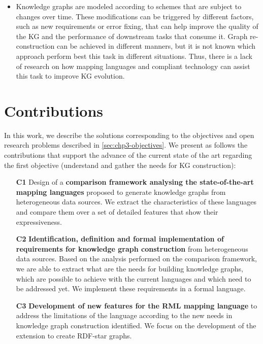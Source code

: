 \begin{itemize}
    \item Knowledge graphs are modeled according to schemes that are subject to changes over time. These modifications can be triggered by different factors, such as new requirements or error fixing, that can help improve the quality of the KG and the performance of downstream tasks that consume it. Graph re-construction can be achieved in different manners, but it is not known which approach perform best this task in different situations. Thus, there is a lack of research on how mapping languages and compliant technology can assist this task to improve KG evolution. 
\end{itemize}

\section{Contributions}
\label{sec:chp3-contributions}

In this work, we describe the solutions corresponding to the objectives and open research problems described in \cref{sec:chp3-objectives}. We present as follows the contributions that support the advance of the current state of the art regarding the first objective (understand and gather the needs for KG construction): 

\begin{enumerate}
    \item[\textbf{C1}] Design of a \textbf{comparison framework analysing the state-of-the-art mapping languages} proposed to generate knowledge graphs from heterogeneous data sources. We extract the characteristics of these languages and compare them over a set of detailed features that show their expressiveness. 
    
    \item[\textbf{C2}] \textbf{Identification, definition and formal implementation of requirements for knowledge graph construction} from heterogeneous data sources. Based on the analysis performed on the comparison framework, we are able to extract what are the needs for building knowledge graphs, which are possible to achieve with the current languages and which need to be addressed yet. We implement these requirements in a formal language. 
    
    \item[\textbf{C3}] \textbf{Development of new features for the RML mapping language} to address the limitations of the language according to the new needs in knowledge graph construction identified. We focus on the development of the extension to create RDF-star graphs. 
\end{enumerate}

